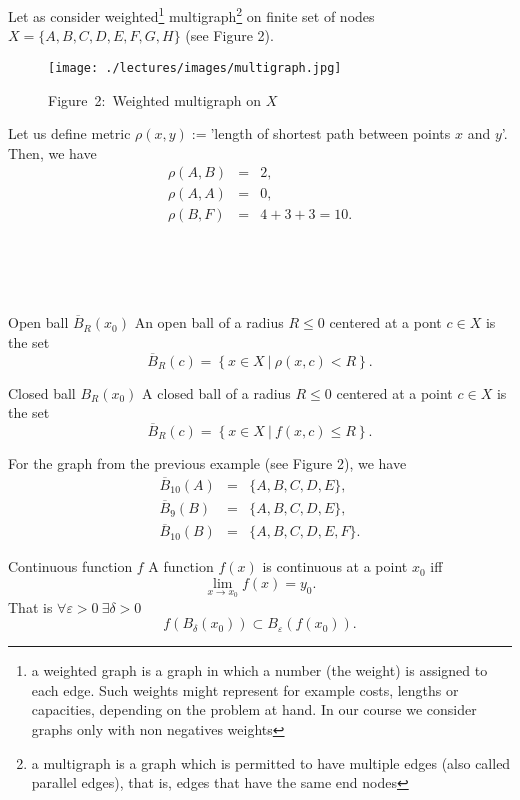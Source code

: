 \Ex 
Let as consider weighted\footnote{a weighted graph is a graph in which a number (the weight) is assigned to each edge. Such weights might represent for example costs, lengths or capacities, depending on the problem at hand. In our course we consider graphs only with non negatives weights} multigraph\footnote{a multigraph is a graph which is permitted to have multiple edges (also called parallel edges), that is, edges that have the same end nodes} on finite set of nodes $X=\{A,B,C,D, E,F,G,H\}$ (see Figure 2). 
\begin{figure}[h]
    \centering
    \texttt{[image: ./lectures/images/multigraph.jpg]}
    \caption*{Figure~2:~Weighted multigraph on $X$}
\end{figure}
Let us define metric $\rho(x,y):=$'length of shortest path between points $x$ and $y$'. Then, we have
\begin{eqnarray}
    \rho(A,B)&=&2,\nonumber\\
    \rho(A,A)&=&0,\nonumber\\
    \rho(B,F)&=&4+3+3=10.\nonumber
\end{eqnarray}

~\\ ~\\ ~\\ 
\begin{definition}{Open ball $\overline{B}_R(x_0)$}{}
    An open ball of a radius $R \leq 0$ centered at a pont $c \in X$ is the set
    \[
        \overline{B}_R(c) = \left\{x \in X\ | \ \rho(x,c) < R\right\}.
    \]
\end{definition}

\begin{definition}{Closed ball ${B}_R(x_0)$}{}
    A closed ball of a radius $R\leq 0$ centered at a point $c \in X$ is the set
    \[
        \overline{B}_R(c) = \left\{x \in X \ | \ f(x, c) \leq R\right\}.  
    \]
\end{definition}

\Ex For the graph from the previous example (see Figure 2), we have
\begin{eqnarray}
    \overline{B}_{10}(A)&=&\{A,B,C,D,E\},\nonumber\\
    \overline{B}_{9}(B)&=&\{A,B,C,D,E\},\nonumber\\
    \overline{B}_{10}(B)&=&\{A,B,C,D,E,F\}.\nonumber
\end{eqnarray}

\begin{definition}{Continuous function $f$}{}
    A function $f(x)$ is continuous at a point $x_0$ iff
    \[
        \lim\limits_{x\to x_0} f(x) = y_0.
    \]
    That is $\forall \varepsilon > 0 \ \exists \delta>0$
    \[
        f\left(B_{\delta}(x_0)\right) \subset B_\varepsilon\left(f(x_0)\right).
    \]
\end{definition}

